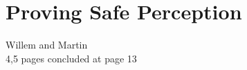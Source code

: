 \section{Proving Safe Perception}\label{sec:proofrule}
Willem and Martin\\
4,5 pages	concluded at page 13\\
